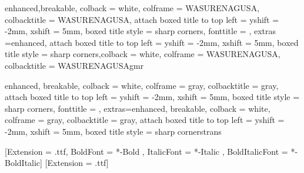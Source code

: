 \setlength{\glossglue}{5pt plus 2pt minus 1pt}
\setmainfont{FreeSerif}
\renewcommand\th{þ}
\noautomath

\patchcmd{\quote}{\rightmargin}{\leftmargin 6em \rightmargin}{}{}
\makeatletter
\renewcommand\@makefntext[1]{%
    \setlength\parindent{1em}%
    \noindent
    \mbox{\textsuperscript{\@thefnmark}\,}{#1}}
\makeatother
\makeatletter
\newcommand{\dynscriptsize}{\check@mathfonts\fontsize{\sf@size}{\z@}\selectfont}
\makeatother
\newcommand\textunderset[2]{%
    \leavevmode
    \vtop{\offinterlineskip
        \halign{%
            \hfil##\hfil\cr %
            \strut#2\cr
            \noalign{\kern-.3ex}
            \dynscriptsize\strut#1\cr
        }%
    }%
}
\newcommand\textoverset[2]{%
    \leavevmode
    \vbox{\offinterlineskip
        \halign{%
            \hfil##\hfil\cr %
            \dynscriptsize\strut#1\cr
            \noalign{\kern-.3ex}
            \strut#2\cr
        }%
    }%
}

{enhanced,breakable,
    colback = white, colframe = WASURENAGUSA, colbacktitle = WASURENAGUSA,
    attach boxed title to top left = {yshift = -2mm, xshift = 5mm},
    boxed title style = {sharp corners},
    fonttitle = \sffamily, extras ={enhanced, attach boxed title to top left = {yshift = -2mm, xshift = 5mm},
            boxed title style = {sharp corners}},colback = white, colframe = WASURENAGUSA, colbacktitle = WASURENAGUSA}{gmr}

{enhanced, breakable,
    colback = white, colframe = gray, colbacktitle = gray,
    attach boxed title to top left = {yshift = -2mm, xshift = 5mm},
    boxed title style = {sharp corners},
    fonttitle = \sffamily, extras={enhanced, breakable,
            colback = white, colframe = gray, colbacktitle = gray,
            attach boxed title to top left = {yshift = -2mm, xshift = 5mm},
            boxed title style = {sharp corners}}}{trans}

[Extension = .ttf,
    BoldFont = *-Bold ,
    ItalicFont = *-Italic ,
    BoldItalicFont = *-BoldItalic]
[Extension = .ttf]


